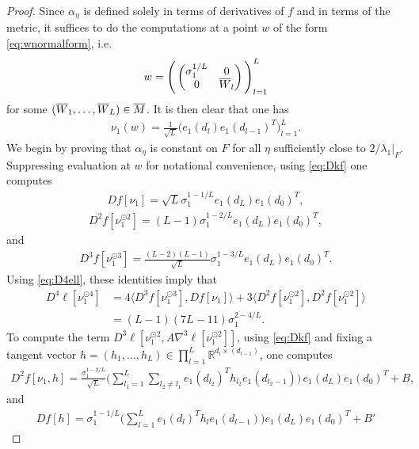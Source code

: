 \documentclass{article}
\newcommand{\RB}{\mathbb{R}}
\newcommand{\bW}{\smash{\overline{W}}\vphantom{W}}
\newcommand{\bM}{\overline{M}}
\theoremstyle{plain}
\theoremstyle{definition}
\theoremstyle{remark}
\begin{document}
\begin{proof}
    Since $\alpha_{\eta}$ is defined solely in terms of derivatives of $f$ and in terms of the metric, it suffices to do the computations at a point $w$ of the form \eqref{eq:wnormalform}, i.e.
    \begin{align}
    w  = \Bigg(\begin{pmatrix}\sigma_1^{1/L} & 0 \\ 0 & \bW_{l}\end{pmatrix}\Bigg)_{l=1}^L
    \end{align}
    for some $(\bW_1,\dots,\bW_L)\in \bM$. It is then clear that one has
    \begin{align}
    \nu_1(w) = \frac{1}{\sqrt{L}}\big(e_1(d_l)e_1(d_{l-1})^T\big)_{l=1}^L.
    \end{align}
    We begin by proving that $\alpha_{\eta}$ is constant on $F$ for all $\eta$ sufficiently close to $2/\lambda_1|_{F}$. Suppressing evaluation at $w$ for notational convenience, using \eqref{eq:Dkf} one computes
    \begin{align}
    Df[\nu_1] = \sqrt{L}\sigma_1^{1-1/L}e_1(d_L)e_1(d_0)^T,
    \end{align}
    \begin{align}
    D^2f[\nu_1^{\odot 2}] = (L-1)\sigma_1^{1-2/L}e_1(d_L)e_1(d_0)^T,
    \end{align}
    and
    \begin{align}
    D^3f[\nu_1^{\odot 3}] =\frac{(L-2)(L-1)}{\sqrt{L}}
\sigma_1^{1-3/L}e_1(d_L)e_1(d_0)^T.
    \end{align}
    Using \eqref{eq:D4ell}, these identities imply that
    \begin{align}
        D^4\ell[\nu_1^{\odot 4}] &= 4\langle D^3f[\nu_1^{\odot 3}],Df[\nu_1]\rangle + 3\langle D^2f[\nu_1^{\odot 2}],D^2f[\nu_1^{\odot 2}]\rangle\\&=(L-1)(7L-11)\sigma_1^{2-4/L}.
    \end{align}
    To compute the term $D^3\ell[\nu_1^{\odot 2},A\nabla^3\ell[\nu_1^{\odot 2}]]$, using \eqref{eq:Dkf} and fixing a tangent vector $h = (h_1,\dots,h_L)\in\prod_{l=1}^L\RB^{d_l\times (d_{l-1})}$, one computes
    \begin{align}
    D^2f[\nu_1,h] = \frac{\sigma_1^{1-2/L}}{\sqrt{L}}\bigg(\sum_{l_1=1}^L\sum_{l_2\neq l_1}e_1(d_{l_2})^Th_{l_2}e_1(d_{l_2-1})\bigg) \,e_1(d_L)e_1(d_0)^T + B,
    \end{align}
    and
    \begin{align}
    Df[h] = \sigma_1^{1-1/L}\bigg(\sum_{l=1}^Le_1(d_l)^Th_le_1(d_{l-1})\bigg)e_1(d_L)e_1(d_0)^T + B'

\end{align}
\end{proof}
\end{document}
